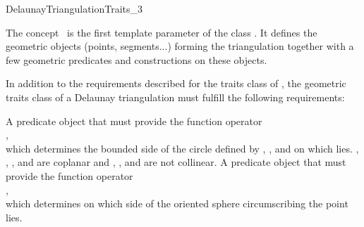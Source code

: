 

\begin{ccRefConcept}{DelaunayTriangulationTraits_3}

\ccDefinition
The concept \ccRefName\ is the first template parameter of the class
. It defines the geometric objects (points,
segments...) forming the triangulation together with a few geometric
predicates and constructions on these objects.

\ccRefines {}

In addition to the requirements described for the traits class of
, the geometric traits class of a
Delaunay triangulation must fulfill the following requirements:

\ccTypes
{}

\ccGlue
{}
\ccGlue
{}


{A predicate object that must provide the function operator\\
,\\
which determines the bounded side of the circle defined
by , , and  on which  lies.
\ccPrecond {}, , , and  are coplanar and
, , and  are not collinear.}
\ccGlue
{}
{A predicate object that must provide the function operator\\
,\\
which determines on which side of the oriented sphere circumscribing 
 the point  lies.}


\end{ccRefConcept}
